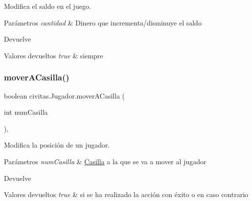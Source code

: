 Modifica el saldo en el juego. 
\begin{DoxyParams}{Parámetros}
{\em cantidad} & Dinero que incrementa/disminuye el saldo \\
\hline
\end{DoxyParams}
\begin{DoxyReturn}{Devuelve}

\end{DoxyReturn}

\begin{DoxyRetVals}{Valores devueltos}
{\em true} & siempre \\
\hline
\end{DoxyRetVals}
\mbox{\label{classcivitas_1_1Jugador_af227e8b7b1b41f042f24e7f65062aa7c}} 
\subsubsection{\texorpdfstring{mover\+A\+Casilla()}{moverACasilla()}}
{\footnotesize\ttfamily boolean civitas.\+Jugador.\+mover\+A\+Casilla (\begin{DoxyParamCaption}\item[{int}]{num\+Casilla }\end{DoxyParamCaption})\hspace{0.3cm}{\ttfamily [inline]}, {\ttfamily [package]}}

Modifica la posición de un jugador. 
\begin{DoxyParams}{Parámetros}
{\em num\+Casilla} & \hyperlink{classcivitas_1_1Casilla}{Casilla} a la que se va a mover al jugador \\
\hline
\end{DoxyParams}
\begin{DoxyReturn}{Devuelve}

\end{DoxyReturn}

\begin{DoxyRetVals}{Valores devueltos}
{\em true} & si se ha realizado la acción con éxito o  en caso contrario \\
\hline
\end{DoxyRetVals}
\mbox{\label{classcivitas_1_1Jugador_a0e052cf2f305003ab8a2084b643ff9bb}} 
